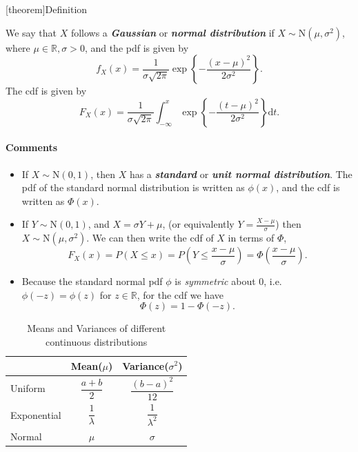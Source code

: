 \documentclass[12pt]{report}
\theoremstyle{definition}
\begin{document}
[theorem]{Definition}
\begin{normal distribution}
    We say that $X$ follows a \textbf{\emph{Gaussian}} or \textbf{\emph{normal
    distribution}} if $X\sim\text{N}(\mu,\sigma^{2})$, where
    $\mu\in\mathbb{R},\sigma>0$, and the pdf is given by
    \[
        f_X(x)=\frac{1}{\sigma\sqrt{2\pi}}\exp\left\{-\frac{{(x-\mu)}^{2}}{2\sigma^{2}}\right\}.
    \]
    The cdf is given by
    \[
        F_X(x)=\frac{1}{\sigma\sqrt{2\pi}}\int_{-\infty}^{x}
        \exp\left\{-\frac{{(t-\mu)}^{2}}{2\sigma^{2}}\right\}\mathrm{d}t.
    \]
\end{normal distribution}
\paragraph{Comments}
\begin{itemize}
    \item If $X\sim\text{N}(0,1)$, then $X$ has a \textbf{\emph{standard}} or
        \textbf{\emph{unit normal distribution}}. The pdf of the standard normal
        distribution is written as $\phi(x)$, and the cdf is written as
        $\Phi(x)$.
    \item If $Y\sim\text{N}(0,1)$, and $X=\sigma Y+\mu$, (or equivalently
        $Y=\frac{X-\mu}{\sigma}$) then $X\sim\text{N}(\mu,\sigma^{2})$.
        We can then write the cdf of $X$ in terms of $\Phi$,
        \[
            F_X(x)=P(X\le x)=P\left(Y\le \frac{x-\mu}{\sigma}\right)
            =\Phi\left(\frac{x-\mu}{\sigma}\right).
        \]
    \item Because the standard normal pdf $\phi$ is \emph{symmetric} about 0,
        i.e.\ $\phi(-z)=\phi(z)$ for $z\in\mathbb{R}$, for the cdf we have
        \[
            \Phi(z)=1-\Phi(-z).
        \]
\end{itemize} 

\begin{table}[h]
    \centering
    \caption{Means and Variances of different continuous distributions}
    \label{mean_var_of_continuous_distributions}
    \def\arraystretch{2.3}
    \begin{tabular}{l||c|c}
        & Mean($\mu$) & Variance($\sigma^{2}$) \\
        \hline\hline
        Uniform & $\dfrac{a+b}{2}$ & $\dfrac{{(b-a)}^{2}}{12}$ \\
        Exponential & $\dfrac{1}{\lambda}$ & $\dfrac{1}{\lambda^{2}}$ \\
        Normal & $\mu$ & $\sigma$
    \end{tabular}
\end{table}
\end{document}
